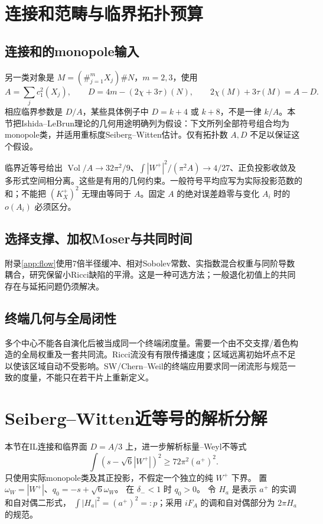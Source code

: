 \documentclass[UTF8,a4paper,11pt,fontset=fandol]{ctexart}
\numberwithin{equation}{section}
\theoremstyle{definition}
\newcommand{\Vol}{\operatorname{Vol}}
\begin{document}
\section{连接和范畴与临界拓扑预算}
\subsection{连接和的monopole输入}
另一类对象是 $M=(\#_{j=1}^{m}X_j)\#N$，$m=2,3$，使用
\[
A=\sum_j c_1^2(X_j),\qquad D=4m-(2\chi+3\tau)(N),\qquad
2\chi(M)+3\tau(M)=A-D.
\]
相应临界参数是 $D/A$，某些具体例子中 $D=k+4$ 或 $k+8$，不是一律 $k/A$。本节把Ishida--LeBrun理论\cite{IL}的几何用途明确列为假设：下文所列全部符号组合均为monopole类，并适用重标度Seiberg--Witten估计。仅有拓扑数 $A,D$ 不足以保证这个假设。

临界近等号给出 $\Vol/A\to32\pi^2/9$、$\int|W^+|^2/(\pi^2A)\to4/27$、正负投影收敛及多形式空间相分离。这些是有用的几何约束。一般符号平均应写为实际投影范数的和；不能把 $(K_X^+)^2$ 无理由等同于 $A$。固定 $A$ 的绝对误差趋零与变化 $A_i$ 时的 $o(A_i)$ 必须区分。

\subsection{选择支撑、加权Moser与共同时间}
附录\ref{app:flow}使用7倍半径缓冲、相对Sobolev常数、实指数混合权重与同阶导数耦合，研究保留小Ricci缺陷的平滑。这是一种可选方法；一般退化初值上的共同存在与延拓问题仍须解决。

\subsection{终端几何与全局闭性}
多个中心不能各自演化后被当成同一个终端闭度量。需要一个由不交支撑/着色构造的全局权重及一套共同流。Ricci流没有有限传播速度；区域远离初始坏点不足以使该区域自动不受影响。SW/Chern--Weil的终端应用要求同一闭流形与规范一致的度量，不能只在若干片上重新定义。

\section{Seiberg--Witten近等号的解析分解}
本节在IL连接和临界面 $D=A/3$ 上，进一步解析标量--Weyl不等式
\begin{equation}\label{eq:primitiveSW}
\int(s-\sqrt6|W^+|)^2\ge72\pi^2(a^+)^2.
\end{equation}
只使用实际monopole类及其正投影，不假定一个独立的纯 $W^+$ 下界。
置 $\omega_W=|W^+|$、$q_0=-s+\sqrt6\omega_W$。
在 $\delta_-<1$ 时 $q_0>0$。
令 $H_a$ 是表示 $a^+$ 的实调和自对偶二形式，
$\int|H_a|^2=(a^+)^2=:p$；采用 $iF_A$ 的调和自对偶部分为 $2\pi H_a$ 的规范。
\end{document}

